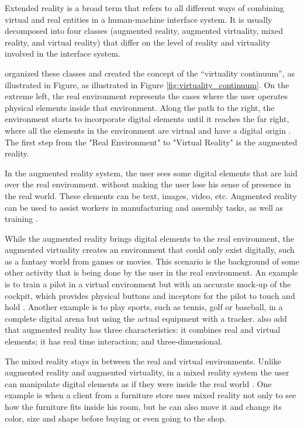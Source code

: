 Extended reality is a broad term that refers to all different ways of combining virtual and real entities in a human-machine interface system. It is usually decomposed into four classes (augmented reality, augmented virtuality, mixed reality, and virtual reality) that differ on the level of reality and virtuality involved in the interface system. 

 organized these classes and created the concept of the “virtuality continuum”, as illustrated in Figure, as illustrated in Figure \ref{fig:virtuality_continuum}. On the extreme left, the real environment represents the cases where the user operates physical elements inside that environment. Along the path to the right, the environment starts to incorporate digital elements until it reaches the far right, where all the elements in the environment are virtual and have a digital origin \cite{nijholt2005virtuality, doolani2020review}. The first step from the "Real Environment" to "Virtual Reality" is the augmented reality.



In the augmented reality system, the user sees some digital elements that are laid over the real environment. without making the user lose his sense of presence in the real world. These elements can be text, images, video, etc. Augmented reality can be used to assist workers in manufacturing and assembly tasks, as well as training \cite{doolani2020review, farrell2018learning, ma2007virtuality}.
    
While the augmented reality brings digital elements to the real environment, the augmented virtuality creates an environment that could only exist digitally, such as a fantasy world from games or movies. This scenario is the background of some other activity that is being done by the user in the real environment. An example is to train a pilot in a virtual environment but with an accurate mock-up of the cockpit, which provides physical buttons and inceptors for the pilot to touch and hold \cite{farshid2018go}. Another example is to play sports, such as tennis, golf or baseball, in a complete digital arena but using the actual equipment with a tracker.  also add that augmented reality has three characteristics: it combines real and virtual elements; it has real time interaction; and three-dimensional.

The mixed reality stays in between the real and virtual environments. Unlike augmented reality and augmented virtuality, in a mixed reality system the user can manipulate digital elements as if they were inside the real world \cite{doolani2020review}. One example is when a client from a furniture store uses mixed reality not only to see how the furniture fits inside his room, but he can also move it and change its color, size and shape before buying or even going to the shop.
    
